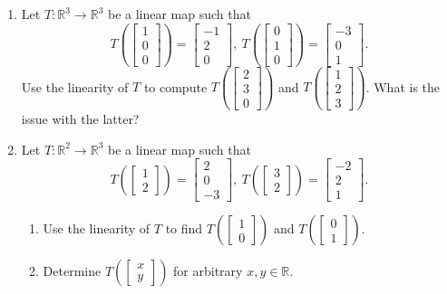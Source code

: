 \documentclass[12pt]{amsart}
\newcommand{\R}{\mathbb{R}}
\begin{document}
\begin{enumerate}
\item
 Let $T\colon\R^3\to\R^3$ be a linear map such that 
\[ T(\left[\begin{matrix} 1 \\ 0 \\ 0 \end{matrix}\right]) = \left[\begin{matrix} -1 \\ 2 \\ 0 \end{matrix}\right],\ T(\left[\begin{matrix} 0 \\ 1 \\ 0 \end{matrix}\right]) = \left[\begin{matrix} -3 \\ 0 \\ 1 \end{matrix}\right]. \]
  Use the linearity of $T$ to compute $T(\left[\begin{matrix} 2 \\ 3 \\ 0 \end{matrix}\right])$ and
 $T(\left[\begin{matrix} 1 \\ 2 \\ 3 \end{matrix}\right])$.
 What is the issue with the latter?


\item
 Let $T\colon\R^2\to\R^3$ be a linear map such that 
\[ T(\left[\begin{matrix} 1 \\ 2 \end{matrix}\right]) = \left[\begin{matrix} 2 \\ 0 \\ -3 \end{matrix}\right],\ T(\left[\begin{matrix} 3 \\ 2 \end{matrix}\right]) = \left[\begin{matrix} -2 \\ 2 \\ 1 \end{matrix}\right]. \]
\begin{enumerate}
\item
 Use the linearity of $T$ to find $T(\left[\begin{matrix} 1 \\ 0 \end{matrix}\right])$ and $T(\left[\begin{matrix} 0 \\ 1 \end{matrix}\right])$.
\item
 Determine $T(\left[\begin{matrix} x \\ y \end{matrix}\right])$ for arbitrary $x,y\in\R$.
\end{enumerate}




\end{enumerate}
\end{document}
